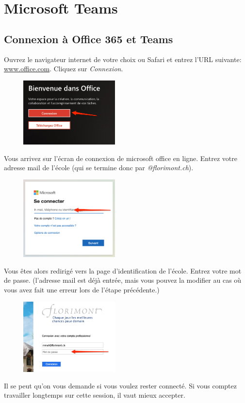 \chapter{Microsoft Teams}\label{teams1}  





\section{Connexion à Office 365 et Teams}

Ouvrez le navigateur internet de votre choix ou Safari et entrez l'URL suivante: \url{www.office.com}. Cliquez sur \textit{Connexion}.

\begin{figure}[h]
\includegraphics[width=5cm]{./images/teams/ecran_office_com_crop}
\centering
\end{figure}

Vous arrivez sur l'écran de connexion de microsoft office en ligne. Entrez votre adresse mail de l'école (qui se termine donc par \textit{@florimont.ch}).

\begin{figure}[h]
\includegraphics[width=5cm]{./images/teams/ecran_connexion_office_com_crop}
\centering
\end{figure}

Vous êtes alors redirigé vers la page d'identification de l’école. Entrez votre mot de passe. (l'adresse mail est déjà entrée, mais vous pouvez la modifier au cas où vous avez fait une erreur lors de l'étape précédente.)

\begin{figure}[h]
\includegraphics[width=5cm]{./images/teams/ecran_connexion_florimont_crop}
\centering
\end{figure}
\newpage
Il se peut qu'on vous demande si vous voulez rester connecté. Si vous comptez travailler longtemps sur cette session, il vaut mieux accepter.\\

